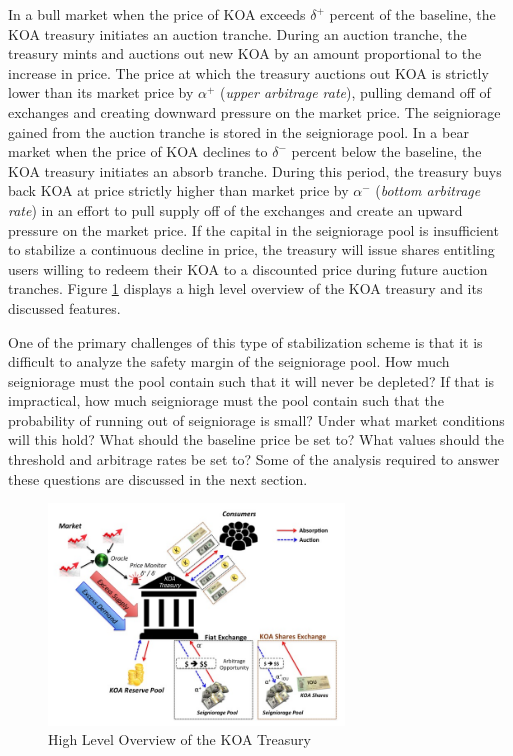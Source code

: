 In a bull market when the price of KOA exceeds $\delta^+$ percent of the baseline, the KOA treasury initiates an auction tranche. During an auction tranche, the treasury mints and auctions out new KOA by an amount proportional to the increase in price. The price at which the treasury auctions out KOA is strictly lower than its market price by $\alpha^+$ (\textit{upper arbitrage rate}), pulling demand off of exchanges and creating downward pressure on the market price. The seigniorage gained from the auction tranche is stored in the seigniorage pool.
%
In a bear market when the price of KOA declines to $\delta^-$ percent below the baseline, the KOA treasury initiates an absorb tranche. During this period, the treasury buys back  KOA at price strictly higher than market price by $\alpha^-$ (\textit{bottom arbitrage rate}) in an effort to pull supply off of the exchanges and create an upward pressure on the market price. If the capital in the seigniorage pool is insufficient to stabilize a continuous decline in price, the treasury will issue shares entitling users willing to redeem their KOA to a discounted price during future auction tranches. Figure \ref{fig:treasury} displays a high level overview of the KOA treasury and its discussed features.

One of the primary challenges of this type of stabilization scheme is that it is difficult to analyze the safety margin of the seigniorage pool. How much seigniorage must the pool contain such that it will never be depleted? If that is impractical, how much seigniorage must the pool contain such that the probability of running out of seigniorage is small? Under what market conditions will this hold? What should the baseline price be set to? What values should the threshold and arbitrage rates be set to? Some of the analysis required to answer these questions are discussed in the next section.
%
\begin{figure}[] %
    \centering
        \includegraphics[keepaspectratio, width=0.7\textwidth]{images/treasury.jpg}
    \caption{High Level Overview of the KOA Treasury} \label{fig:treasury}
\end{figure}

